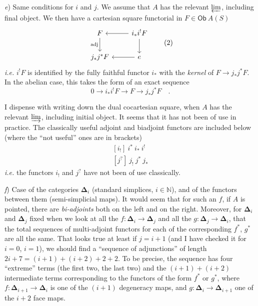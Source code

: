 \documentclass[11pt]{article}
\newcommand{\printedpage}[1]{\marginpar{\footnotesize p.~#1}}
\newcommand{\msp}[1]{\marginpar{\footnotesize [#1]}}
\newcommand{\Ob}{\mathsf{Ob}}
\newcommand{\bDelta}{\boldsymbol{\Delta}}
\begin{document}
\textit{e}) Same conditions for $i$ and $j$. We assume that $A$ has the relevant $\varprojlim$, including final object. We then have a cartesian square functorial in $F\in \Ob\ A(S)$
\[
\begin{tikzcd}
F \arrow[d, "\text{adj}"'] & i_{*}i^{!}F \arrow[l] \arrow[d] \\
j_{*}j^{*}F & e \arrow[l]
\end{tikzcd}
\tag*{(2)}
\]
\textit{i.e.} $i^{!}F$ is identified by the fully faithful functor $i_{*}$ with the \textit{kernel} of $F\to j_{*}j^{*}F$. In the abelian case, this takes the form of an exact sequence
\[
0 \longrightarrow i_{*}i^{!}F \longrightarrow F \longrightarrow j_{*}j^{*}F \quad .
\]

\clearpage

\printedpage{3}

\msp{page 3}

I dispense with writing down the dual cocartesian square, when $A$ has the relevant $\varinjlim$, including initial object. It seems that it has not been of use in practice. The classically useful adjoint and biadjoint functors are included below (where the ``not useful'' ones are in brackets)
\[
\begin{aligned}
{}[i_{!}]\ i^{*}\ i_{*}\ i^{!} \\
[j^{?}]\ j_{!}\ j^{*}\ j_{*}
\end{aligned}
\]
\textit{i.e.} the functors $i_{!}$ and $j^{?}$ have not been of use classically.

\textit{f}) Case of the categories $\bDelta_{i}$ (standard simplices, $i\in\mathbb{N}$), and of the functors between them (semi-simplicial maps). It would seem that for such an $f$, if $A$ is pointed, there are \textit{bi-adjoints} both on the left and on the right. Moreover, for $\bDelta_{i}$ and $\bDelta_{j}$ fixed when we look at all the $f:\bDelta_{i}\to\bDelta_{j}$ and all the $g:\bDelta_{j}\to\bDelta_{i}$, that the total sequences of multi-adjoint functors for each of the corresponding $f^{*}$, $g^{*}$ are all the same. That looks true at least if $j=i+1$ (and I have checked it for $i=0$, $i=1$), we should find a ``sequence of adjunctions'' of length $2i+7=(i+1)+(i+2)+2+2$. To be precise, the sequence has four ``extreme'' terms (the first two, the last two) and the $(i+1)+(i+2)$ intermediate terms corresponding to the functors of the form $f^{*}$ or $g^{*}$, where $f:\bDelta_{i+1}\to\bDelta_{i}$ is one of the $(i+1)$ degeneracy maps, and $g:\bDelta_{i}\to\bDelta_{i+1}$ one of the $i+2$ face maps.
\end{document}
